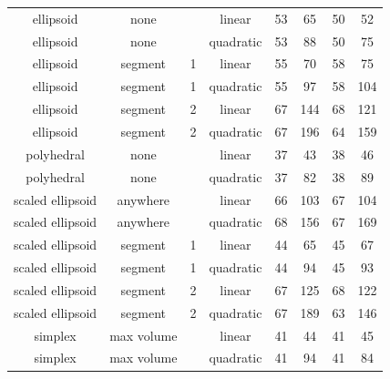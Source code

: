 \begin{center}
\begin{tabular}{ c c c c c c c c }
                ellipsoid &       none &       &     linear &  53  &    65  &   50 &   52 \\
                ellipsoid &       none &       &  quadratic &  53  &    88  &   50 &   75 \\
                ellipsoid &    segment &     1 &     linear &  55  &    70  &   58 &   75 \\
                ellipsoid &    segment &     1 &  quadratic &  55  &    97  &   58 &  104 \\
                ellipsoid &    segment &     2 &     linear &  67  &   144  &   68 &  121 \\
                ellipsoid &    segment &     2 &  quadratic &  67  &   196  &   64 &  159 \\
               polyhedral &       none &       &     linear &  37  &    43  &   38 &   46 \\
               polyhedral &       none &       &  quadratic &  37  &    82  &   38 &   89 \\
         scaled ellipsoid &   anywhere &       &     linear &  66  &   103  &   67 &  104 \\
         scaled ellipsoid &   anywhere &       &  quadratic &  68  &   156  &   67 &  169 \\
         scaled ellipsoid &    segment &     1 &     linear &  44  &    65  &   45 &   67 \\
         scaled ellipsoid &    segment &     1 &  quadratic &  44  &    94  &   45 &   93 \\
         scaled ellipsoid &    segment &     2 &     linear &  67  &   125  &   68 &  122 \\
         scaled ellipsoid &    segment &     2 &  quadratic &  67  &   189  &   63 &  146 \\
                  simplex & max volume &       &     linear &  41  &    44  &   41 &   45 \\
                  simplex & max volume &       &  quadratic &  41  &    94  &   41 &   84 \\


\end{tabular}
\end{center}
